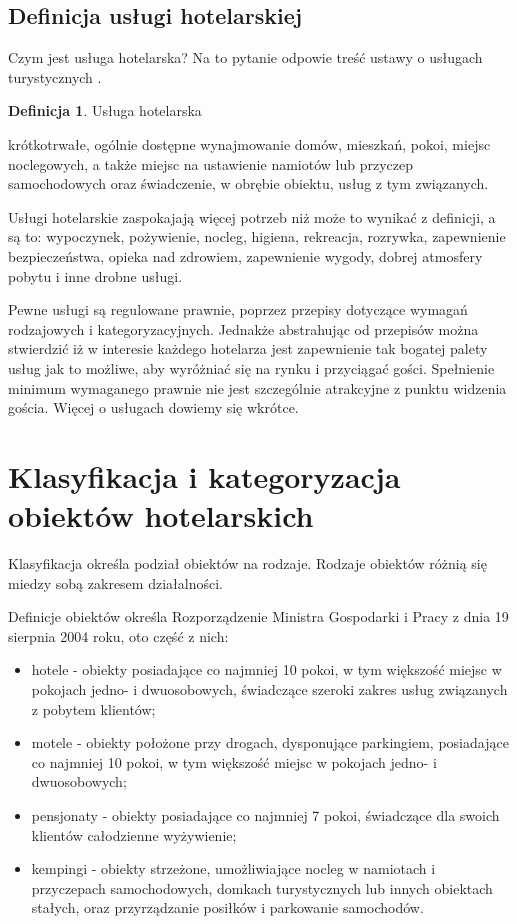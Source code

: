 \documentclass[a4paper,onecolumn,oneside,11pt,wide,floatssmall]{mwrep}
\theoremstyle{definition}
\newtheorem{defn}{Definicja}[section]
\theoremstyle{plain}%
\theoremstyle{remark}
\begin{document}
\subsection{Definicja usługi hotelarskiej}

Czym jest usługa hotelarska? Na to pytanie odpowie treść ustawy o usługach 
turystycznych \cite{ust:tur}.

\begin{defn}{Usługa hotelarska}

krótkotrwałe, ogólnie dostępne wynajmowanie domów, mieszkań, pokoi, miejsc 
noclegowych, a także miejsc na ustawienie namiotów lub przyczep 
samochodowych oraz świadczenie, w obrębie obiektu, usług z tym związanych.

\end{defn}

Usługi hotelarskie zaspokajają więcej potrzeb niż może to wynikać z 
definicji, a są to: wypoczynek, pożywienie, nocleg, higiena, rekreacja, 
rozrywka, zapewnienie bezpieczeństwa, opieka nad zdrowiem, zapewnienie 
wygody, dobrej atmosfery pobytu i inne drobne usługi.

Pewne usługi są regulowane prawnie, poprzez przepisy dotyczące wymagań 
rodzajowych i kategoryzacyjnych. Jednakże abstrahując od przepisów można 
stwierdzić iż w interesie każdego hotelarza jest zapewnienie tak bogatej 
palety usług jak to możliwe, aby wyróżniać się na rynku i przyciągać gości. 
Spełnienie minimum wymaganego prawnie nie jest szczególnie atrakcyjne z 
punktu widzenia gościa. Więcej o usługach dowiemy się wkrótce.

\section{Klasyfikacja i kategoryzacja obiektów hotelarskich}
Klasyfikacja określa podział obiektów na rodzaje. Rodzaje obiektów różnią 
się miedzy sobą zakresem działalności.

Definicje obiektów określa Rozporządzenie Ministra Gospodarki i Pracy z dnia 
19 sierpnia 2004 roku, oto część z nich:

\begin{itemize}
  \item hotele - obiekty posiadające co najmniej 10 pokoi, w tym większość 
  miejsc w pokojach jedno- i dwuosobowych, świadczące szeroki zakres usług 
  związanych z pobytem klientów;
  \item motele - obiekty położone przy drogach, dysponujące parkingiem, 
  posiadające co najmniej 10 pokoi, w tym większość miejsc w pokojach jedno- 
  i dwuosobowych;
  \item pensjonaty - obiekty posiadające co najmniej 7 pokoi, świadczące dla 
  swoich klientów całodzienne wyżywienie;
  \item kempingi - obiekty strzeżone, umożliwiające nocleg w namiotach i 
  przyczepach samochodowych, domkach turystycznych lub innych obiektach 
  stałych, oraz przyrządzanie posiłków i parkowanie samochodów.
\end{itemize}
\end{document}
